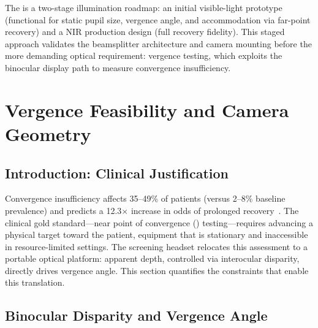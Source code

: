 The  is a two-stage illumination roadmap: an initial visible-light prototype (functional for static pupil size, vergence angle, and accommodation via far-point recovery) and a NIR production design (full  recovery fidelity). This staged approach validates the beamsplitter architecture and camera mounting before the more demanding optical requirement: vergence testing, which exploits the binocular display path to measure convergence insufficiency.



\section{Vergence Feasibility and Camera Geometry}
\label{sec:hw-vergence}


\subsection{Introduction: Clinical Justification}
\label{sec:hw-vergence-clinical}

Convergence insufficiency affects 35--49\% of  patients (versus 2--8\% baseline prevalence) and predicts a 12.3$\times$ increase in odds of prolonged recovery~\cite{mucha2014voms, master2016vision, duprey2017convergence}. The clinical gold standard---near point of convergence () testing---requires advancing a physical target toward the patient, equipment that is stationary and inaccessible in resource-limited settings. The screening headset relocates this assessment to a portable optical platform: apparent depth, controlled via interocular disparity, directly drives vergence angle. This section quantifies the constraints that enable this translation.


\subsection{Binocular Disparity and Vergence Angle}
\label{sec:hw-binocular-disparity}

